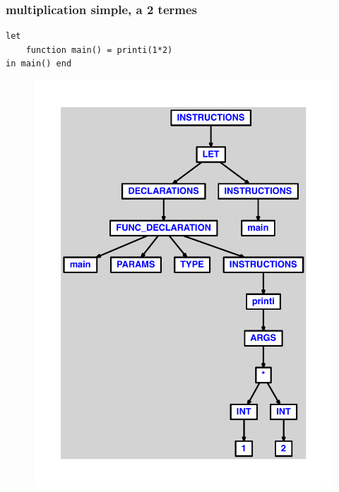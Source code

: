 \documentclass{article}
\begin{document}
\subsubsection{multiplication simple, a 2 termes}
\begin{lstlisting}
let
	function main() = printi(1*2)
in main() end
\end{lstlisting}
\newpage
\begin{figure}[H]
\centering
\includegraphics[max width=\textwidth]{ast/ast_41.pdf}
\end{figure}
\newpage
\end{document}
